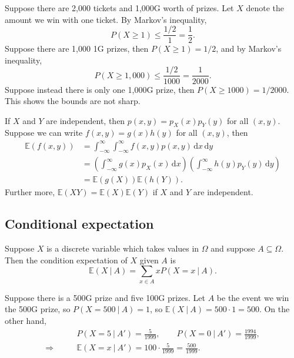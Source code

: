 \documentclass[letter-paper]{tufte-book}
\newenvironment{example}[1][Example]{\begin{trivlist}
\item[\hskip \labelsep {\bfseries #1}]}{\end{trivlist}}
\begin{document}
\begin{example}
  Suppose there are 2,000 tickets and 1,000G worth of prizes. Let $X$ denote the
  amount we win with one ticket. By Markov's inequality,
  \begin{equation*}
    P(X\geq 1) \leq \frac{1/2}{1} = \frac{1}{2}.
  \end{equation*}
  Suppose there are 1,000 1G prizes, then $P(X\geq 1) = 1/2$, and by Markov's
  inequality,
  \begin{equation*}
    P(X\geq 1,000) \leq \frac{1/2}{1000} = \frac{1}{2000}.
  \end{equation*}
  Suppose instead there is only one 1,000G prize, then $P(X\geq1000) = 1/2000$.
  This shows the bounds are not sharp.
\end{example}

If $X$ and $Y$ are independent, then $p(x,y) = p_X(x) p_Y(y)$ for all $(x,y)$.
Suppose we can write $f(x,y) = g(x) h(y)$ for all $(x,y)$, then 
\begin{align*}
  \mathbb{E}(f(x,y)) &= \int_{-\infty}^\infty\int_{-\infty}^\infty f(x,y)p(x,y)\, \mathrm{d}x\, \mathrm{d}y \\
    & = \left(\int_{-\infty}^\infty g(x)p_X(x)\, \mathrm{d}x\right)
        \left(\int_{-\infty}^\infty h(y)p_Y(y)\, \mathrm{d}y\right) \\
    & = \mathbb{E}(g(X))\mathbb{E}(h(Y)).
\end{align*}
Further more, $\mathbb{E}(XY) = \mathbb{E}(X)\mathbb{E}(Y)$ if $X$ and $Y$ are
independent.


\subsection{Conditional expectation}

Suppose $X$ is a discrete variable which takes values in $\Omega$ and suppose
$A\subseteq\Omega$. Then the condition expectation of $X$ given $A$ is
\begin{equation*}
  \mathbb{E}(X\ |\ A) = \sum_{x\in A} xP(X=x\ |\ A).
\end{equation*}

\begin{example}
  Suppose there is a 500G prize and five 100G prizes. Let $A$ be the event we
  win the 500G prize, so $P(X=500\ |\ A) = 1$, so $\mathbb{E}(X\ |\ A) =
  500\cdot1=500$. On the other hand,
  \begin{align*}
    & P(X=5\ |\ A') = \frac{5}{1999}, \qquad P(X=0\ |\ A') = \frac{1994}{1999},\\
    \Rightarrow \qquad & \mathbb{E}(X=x\ |\ A') = 100\cdot\frac{5}{1999} = \frac{500}{1999}.
  \end{align*}
\end{example}
\end{document}

